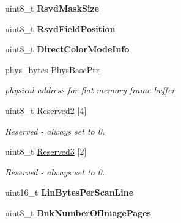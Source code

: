 \begin{DoxyCompactItemize}
\item 
\hypertarget{group__vbe_ga87d544680f1132f30b038c0ebf0b829b}{}uint8\+\_\+t {\bfseries Rsvd\+Mask\+Size}\label{group__vbe_ga87d544680f1132f30b038c0ebf0b829b}

\item 
\hypertarget{group__vbe_gaa357b085181776f2918a6df25c88846b}{}uint8\+\_\+t {\bfseries Rsvd\+Field\+Position}\label{group__vbe_gaa357b085181776f2918a6df25c88846b}

\item 
\hypertarget{group__vbe_ga3bf2fd2394ec8649ec3d26104be35dd7}{}uint8\+\_\+t {\bfseries Direct\+Color\+Mode\+Info}\label{group__vbe_ga3bf2fd2394ec8649ec3d26104be35dd7}

\item 
\hypertarget{group__vbe_ga1d11f4921094db253fc2c2ee6fbb2afb}{}phys\+\_\+bytes \hyperlink{group__vbe_ga1d11f4921094db253fc2c2ee6fbb2afb}{Phys\+Base\+Ptr}\label{group__vbe_ga1d11f4921094db253fc2c2ee6fbb2afb}

\begin{DoxyCompactList}\small\item\em physical address for flat memory frame buffer \end{DoxyCompactList}\item 
\hypertarget{group__vbe_ga09b5824ec5c67bee2a4b36c0ab5181bc}{}uint8\+\_\+t \hyperlink{group__vbe_ga09b5824ec5c67bee2a4b36c0ab5181bc}{Reserved2} \mbox{[}4\mbox{]}\label{group__vbe_ga09b5824ec5c67bee2a4b36c0ab5181bc}

\begin{DoxyCompactList}\small\item\em Reserved -\/ always set to 0. \end{DoxyCompactList}\item 
\hypertarget{group__vbe_ga2455a82e0d8cc0e8d76e8cf77a68bd39}{}uint8\+\_\+t \hyperlink{group__vbe_ga2455a82e0d8cc0e8d76e8cf77a68bd39}{Reserved3} \mbox{[}2\mbox{]}\label{group__vbe_ga2455a82e0d8cc0e8d76e8cf77a68bd39}

\begin{DoxyCompactList}\small\item\em Reserved -\/ always set to 0. \end{DoxyCompactList}\item 
\hypertarget{group__vbe_ga53c5060b6ac14a7418ca8421edfb9981}{}uint16\+\_\+t {\bfseries Lin\+Bytes\+Per\+Scan\+Line}\label{group__vbe_ga53c5060b6ac14a7418ca8421edfb9981}

\item 
\hypertarget{group__vbe_ga33ba903e149724b1bc99b3b8e43a7cbe}{}uint8\+\_\+t {\bfseries Bnk\+Number\+Of\+Image\+Pages}\label{group__vbe_ga33ba903e149724b1bc99b3b8e43a7cbe}


\end{DoxyCompactItemize}

